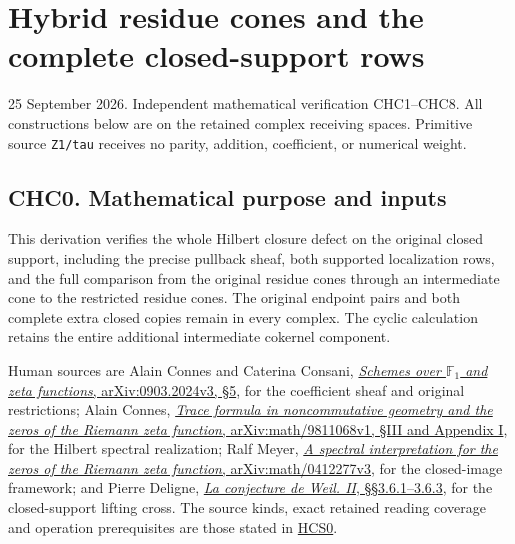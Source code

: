 \section{Hybrid residue cones and the complete closed-support
rows}\label{hybrid-residue-cones-and-the-complete-closed-support-rows}

25 September 2026. Independent mathematical verification CHC1--CHC8. All
constructions below are on the retained complex receiving spaces.
Primitive source \texttt{Z1/tau} receives no parity, addition,
coefficient, or numerical weight.

\subsection{CHC0. Mathematical purpose and
inputs}\label{chc0.-mathematical-purpose-and-inputs}

This derivation verifies the whole Hilbert closure defect on the
original closed support, including the precise pullback sheaf, both
supported localization rows, and the full comparison from the original
residue cones through an intermediate cone to the restricted residue
cones. The original endpoint pairs and both complete extra closed copies
remain in every complex. The cyclic calculation retains the entire
additional intermediate cokernel component.

Human sources are Alain Connes and Caterina Consani,
\href{https://arxiv.org/abs/0903.2024v3}{\emph{Schemes over
\(\mathbb F_1\) and zeta functions}, arXiv:0903.2024v3, §5}, for the
coefficient sheaf and original restrictions; Alain Connes,
\href{https://arxiv.org/abs/math/9811068v1}{\emph{Trace formula in
noncommutative geometry and the zeros of the Riemann zeta function},
arXiv:math/9811068v1, §III and Appendix I}, for the Hilbert spectral
realization; Ralf Meyer,
\href{https://arxiv.org/abs/math/0412277v3}{\emph{A spectral
interpretation for the zeros of the Riemann zeta function},
arXiv:math/0412277v3}, for the closed-image framework; and Pierre
Deligne,
\href{https://www.numdam.org/item/PMIHES_1980__52__137_0/}{\emph{La
conjecture de Weil. II}, §§3.6.1--3.6.3}, for the closed-support lifting
cross. The source kinds, exact retained reading coverage and operation
prerequisites are those stated in
\href{https://github.com/KokunoYumeto/zeta-function-research-reader/blob/main/workbenches/splitzero-tandem/continuations/20260925-full-source-tensor-and-original-divisor/counterfactual/HILBERT_CLOSURE_CLOSED_SUPPORT_AND_RESTRICTION.md}{HCS0}.

